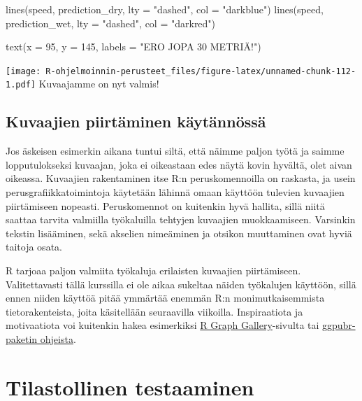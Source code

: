 \documentclass[
]{book}
\newenvironment{Shaded}{\begin{snugshade}}{\end{snugshade}}
\newcommand{\AttributeTok}[1]{\textcolor[rgb]{0.77,0.63,0.00}{#1}}
\newcommand{\DecValTok}[1]{\textcolor[rgb]{0.00,0.00,0.81}{#1}}
\newcommand{\FunctionTok}[1]{\textcolor[rgb]{0.00,0.00,0.00}{#1}}
\newcommand{\NormalTok}[1]{#1}
\newcommand{\StringTok}[1]{\textcolor[rgb]{0.31,0.60,0.02}{#1}}
\begin{document}
\begin{Shaded}
\begin{Highlighting}[]
\FunctionTok{lines}\NormalTok{(speed, prediction\_dry, }\AttributeTok{lty =} \StringTok{"dashed"}\NormalTok{, }\AttributeTok{col =} \StringTok{"darkblue"}\NormalTok{)}
\FunctionTok{lines}\NormalTok{(speed, prediction\_wet, }\AttributeTok{lty =} \StringTok{"dashed"}\NormalTok{, }\AttributeTok{col =} \StringTok{"darkred"}\NormalTok{)}

\FunctionTok{text}\NormalTok{(}\AttributeTok{x =} \DecValTok{95}\NormalTok{, }\AttributeTok{y =} \DecValTok{145}\NormalTok{, }\AttributeTok{labels =} \StringTok{"ERO JOPA 30 METRIÄ!"}\NormalTok{) }
\end{Highlighting}
\end{Shaded}

\texttt{[image: R-ohjelmoinnin-perusteet\_files/figure-latex/unnamed-chunk-112-1.pdf]}
Kuvaajamme on nyt valmis!

\hypertarget{kuvaajien-piirtuxe4minen-kuxe4ytuxe4nnuxf6ssuxe4}{%
\section{Kuvaajien piirtäminen käytännössä}\label{kuvaajien-piirtuxe4minen-kuxe4ytuxe4nnuxf6ssuxe4}}

Jos äskeisen esimerkin aikana tuntui siltä, että näimme paljon työtä ja saimme lopputulokseksi kuvaajan, joka ei oikeastaan edes näytä kovin hyvältä, olet aivan oikeassa. Kuvaajien rakentaminen itse R:n peruskomennoilla on raskasta, ja usein perusgrafiikkatoimintoja käytetään lähinnä omaan käyttöön tulevien kuvaajien piirtämiseen nopeasti. Peruskomennot on kuitenkin hyvä hallita, sillä niitä saattaa tarvita valmiilla työkaluilla tehtyjen kuvaajien muokkaamiseen. Varsinkin tekstin lisääminen, sekä akselien nimeäminen ja otsikon muuttaminen ovat hyviä taitoja osata.

R tarjoaa paljon valmiita työkaluja erilaisten kuvaajien piirtämiseen. Valitettavasti tällä kurssilla ei ole aikaa sukeltaa näiden työkalujen käyttöön, sillä ennen niiden käyttöä pitää ymmärtää enemmän R:n monimutkaisemmista tietorakenteista, joita käsitellään seuraavilla viikoilla. Inspiraatiota ja motivaatiota voi kuitenkin hakea esimerkiksi \href{https://www.r-graph-gallery.com/index.html}{R Graph Gallery}-sivulta tai \href{https://rpkgs.datanovia.com/ggpubr/index.html}{ggpubr-paketin ohjeista}.

\hypertarget{tests}{%
\chapter{Tilastollinen testaaminen}\label{tests}}
\end{document}
